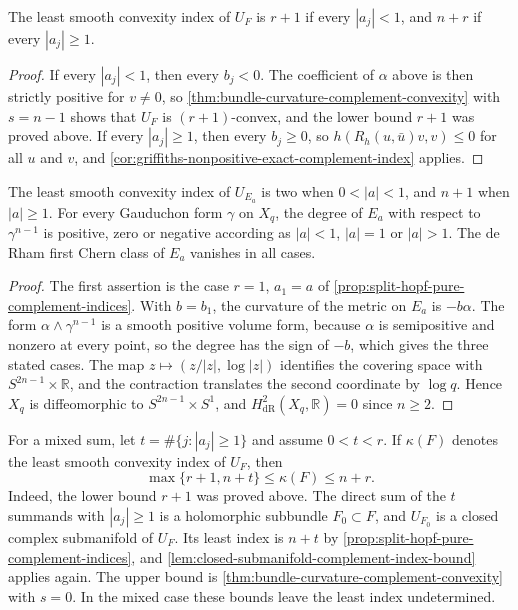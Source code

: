 \begin{proposition}\label{prop:split-hopf-pure-complement-indices}
The least smooth convexity index of $U_F$ is $r+1$ if every $|a_j|<1$, and $n+r$ if every $|a_j|\geq1$.
\end{proposition}
\begin{proof}
If every $|a_j|<1$, then every $b_j<0$. The coefficient of $\alpha$ above is then strictly positive for $v\ne0$, so \cref{thm:bundle-curvature-complement-convexity} with $s=n-1$ shows that $U_F$ is $(r+1)$-convex, and the lower bound $r+1$ was proved above. If every $|a_j|\geq1$, then every $b_j\geq0$, so $h(R_h(u,\bar u)v,v)\leq0$ for all $u$ and $v$, and \cref{cor:griffiths-nonpositive-exact-complement-index} applies.
\end{proof}

\begin{example}\label{ex:hopf-exact-complement-index}
The least smooth convexity index of $U_{E_a}$ is two when $0<|a|<1$, and $n+1$ when $|a|\geq1$. For every Gauduchon form $\gamma$ on $X_q$, the degree of $E_a$ with respect to $\gamma^{n-1}$ is positive, zero or negative according as $|a|<1$, $|a|=1$ or $|a|>1$. The de Rham first Chern class of $E_a$ vanishes in all cases.
\end{example}
\begin{proof}
The first assertion is the case $r=1$, $a_1=a$ of \cref{prop:split-hopf-pure-complement-indices}. With $b=b_1$, the curvature of the metric on $E_a$ is $-b\alpha$. The form $\alpha\wedge\gamma^{n-1}$ is a smooth positive volume form, because $\alpha$ is semipositive and nonzero at every point, so the degree has the sign of $-b$, which gives the three stated cases. The map $z\mapsto(z/|z|,\log|z|)$ identifies the covering space with $S^{2n-1}\times\mathbb R$, and the contraction translates the second coordinate by $\log q$. Hence $X_q$ is diffeomorphic to $S^{2n-1}\times S^1$, and $H^2_{\mathrm{dR}}(X_q,\mathbb R)=0$ since $n\geq2$.
\end{proof}

For a mixed sum, let $t=\#\{j:|a_j|\geq1\}$ and assume $0<t<r$. If $\kappa(F)$ denotes the least smooth convexity index of $U_F$, then
\[
 \max\{r+1,n+t\}\leq\kappa(F)\leq n+r.
\]
Indeed, the lower bound $r+1$ was proved above. The direct sum of the $t$ summands with $|a_j|\geq1$ is a holomorphic subbundle $F_0\subset F$, and $U_{F_0}$ is a closed complex submanifold of $U_F$. Its least index is $n+t$ by \cref{prop:split-hopf-pure-complement-indices}, and \cref{lem:closed-submanifold-complement-index-bound} applies again. The upper bound is \cref{thm:bundle-curvature-complement-convexity} with $s=0$. In the mixed case these bounds leave the least index undetermined.
